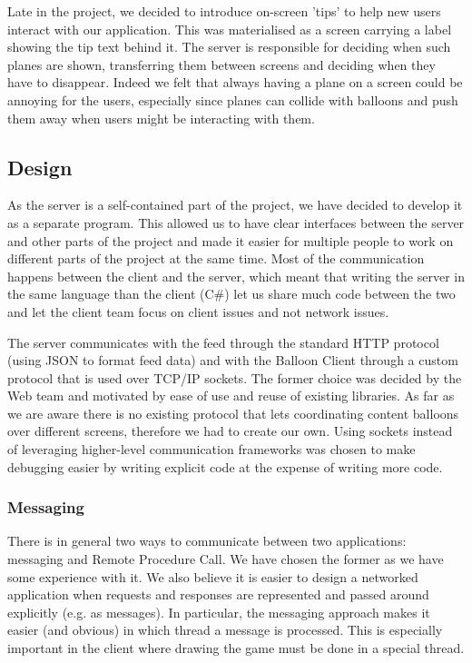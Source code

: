 Late in the project, we decided to introduce on-screen 'tips' to help new users
interact with our application. This was materialised as a screen carrying a label
showing the tip text behind it. The server is responsible for deciding when 
such planes are shown, transferring them between screens and deciding when they
have to disappear. Indeed we felt that always having a plane on a screen could
be annoying for the users, especially since planes can collide with balloons 
and push them away when users might be interacting with them.

\clearpage{}
\subsection{Design}

As the server is a self-contained part of the project, we have decided to 
develop it as a separate program. This allowed us to have clear interfaces 
between the server and other parts of the project and made it easier for
multiple people to work on different parts of the project at the same time.
Most of the communication happens between the client and the server, which 
meant that writing the server in the same language than the client (C\#) let us 
share much code between the two and let the client team focus on client issues 
and not network issues.

The server communicates with the feed through the standard HTTP protocol 
(using JSON to format feed data) and with the Balloon Client through a custom 
protocol that is used over TCP/IP sockets. The former choice was decided by the 
Web team and motivated by ease of use and reuse of existing libraries. As far 
as we are aware there is no existing protocol that lets coordinating content
balloons over different screens, therefore we had to create our own. Using 
sockets instead of leveraging higher-level communication frameworks was chosen 
to make debugging easier by writing explicit code at the expense of writing 
more code.

\subsubsection{Messaging}

There is in general two ways to communicate between two applications: messaging 
and Remote Procedure Call. We have chosen the former as we have some experience 
with it. We also believe it is easier to design a networked application when 
requests and responses are represented and passed around explicitly (e.g. as 
messages). In particular, the messaging approach makes it easier (and obvious) 
in which thread a message is processed. This is especially important in the 
client where drawing the game must be done in a special thread.


